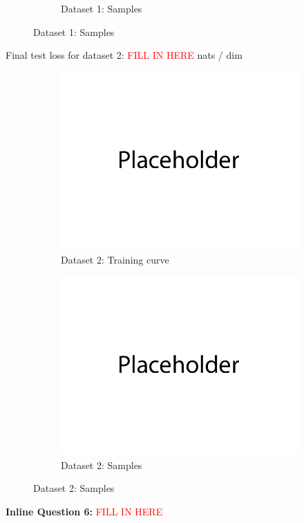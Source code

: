 \documentclass{article}
\begin{document}
\begin{enumerate}[(a)]
\begin{figure}[H]
\begin{subfigure}{0.45\textwidth}
        \caption{Dataset 1: Samples}
    \end{subfigure}
\end{figure}
Final test loss for dataset 2: \textcolor{red}{FILL IN HERE}  nats / dim
\begin{figure}[H]
    \centering
    \begin{subfigure}{0.45\textwidth}
        \centering
        \includegraphics[width=\textwidth]{figures/placeholder.png}
        \caption{Dataset 2: Training curve}
    \end{subfigure}
    \hspace{0.2in}
    \begin{subfigure}{0.45\textwidth}
        \centering
        \includegraphics[width=\textwidth]{figures/placeholder.png}
        \caption{Dataset 2: Samples}
    \end{subfigure}
\end{figure}
\textbf{Inline Question 6:} \textcolor{red}{FILL IN HERE}


\end{enumerate}
\end{document}

